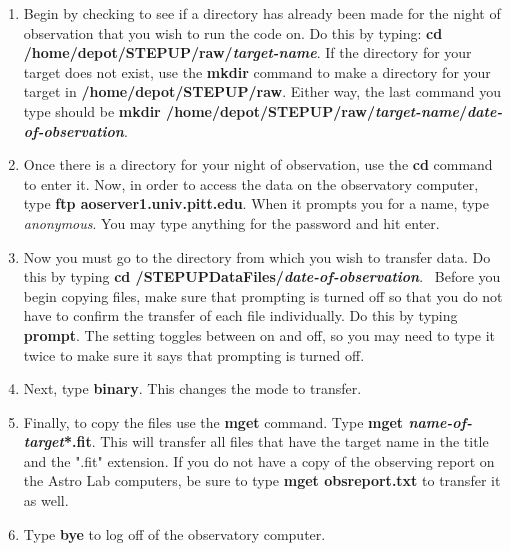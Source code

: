 \documentclass[11pt]{report}
\begin{document}
\begin{enumerate}
\item Begin by checking to see if a directory has already been made for the night of observation that you wish to run the code on. Do this by typing: {\bf cd /home/depot/STEPUP/raw/\emph{target-name}}. If the directory for your target does not exist, use the {\bf mkdir} command to make a directory for your target in {\bf /home/depot/STEPUP/raw}. Either way, the last command you type should be {\bf mkdir /home/depot/STEPUP/raw/\emph{target-name}/\emph{date-of-observation}}. 
\item Once there is a directory for your night of observation, use the {\bf cd} command to enter it. Now, in order to access the data on the observatory computer, type {\bf ftp aoserver1.univ.pitt.edu}. When it prompts you for a name, type \emph{anonymous}. You may type anything for the password and hit enter.
\item Now you must go to the directory from which you wish to transfer data. Do this by typing {\bf cd /STEPUPDataFiles/\emph{date-of-observation}}.
\ Before you begin copying files, make sure that prompting is turned off so that you do not have to confirm the transfer of each file individually. Do this by typing {\bf prompt}. The setting toggles between on and off, so you may need to type it twice to make sure it says that prompting is turned off.
\item Next, type {\bf binary}. This changes the mode to transfer.
\item Finally, to copy the files use the {\bf mget} command. Type {\bf mget \emph{name-of-target}*.fit}. This will transfer all files that have the target name in the title and the ".fit" extension. If you do not have a copy of the observing report on the Astro Lab computers, be sure to type {\bf mget obsreport.txt} to transfer it as well. 
\item Type {\bf bye} to log off of the observatory computer.
\end{enumerate}
\end{document}

